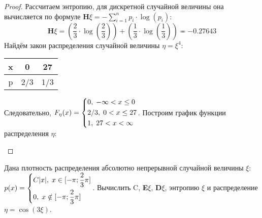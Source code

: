 \begin{proof}
	Рассчитаем энтропию, для дискретной случайной величины она вычисляется по формуле $\textbf{H}\xi = -\sum_{i = 1}^{n} p_i \cdot \log(p_i)$:
	\[
		\textbf{H}\xi = (\frac{2}{3} \cdot \log(\frac{2}{3})) + (\frac{1}{3} \cdot \log(\frac{1}{3})) \eqcirc -0.27643
	\]
	Найдём закон распределения случайной величины $\eta = \xi^4$:
	\begin{center}
		\begin{tabular}{|c||c|c|}
			\hline
			x & 0 & 27 \\
			\hline
			p & 2/3 & 1/3 \\
			\hline
		\end{tabular}
	\end{center}
	Следовательно, $F_\eta(x)=
	\begin{dcases}
		0, \; -\infty < x \leq 0\\
		2/3, \; 0 < x \leq 27\\
		1, \; 27 < x < \infty
	\end{dcases}$. Построим график функции распределения $\eta$:
	\begin{center}
	\end{center}
\end{proof}

\begin{problem}
	Дана плотность распределения абсолютно непрерывной случайной величины $\xi$: $p(x)=
	\begin{dcases}
		C|x|, \; x \in [-\pi;\frac{2}{3}\pi]\\
		0, \; x \notin [-\pi;\frac{2}{3}\pi]
	\end{dcases}$. Вычислить C, \textbf{E}$\xi$, \textbf{D}$\xi$, энтропию $\xi$ и распределение $\eta = \cos(3\xi)$.
\end{problem}

